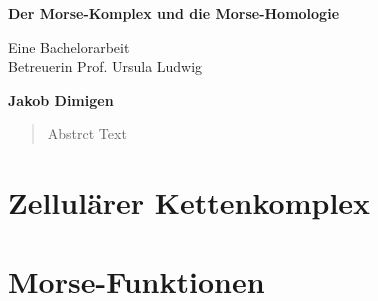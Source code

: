 \documentclass[a4paper,11pt,draft]{scrreport}
\begin{document}
\begin{titlepage}
    \begin{center}
        \vspace*{1cm}
 
        \Large{\textbf{Der Morse-Komplex und die Morse-Homologie}}
 
        \vspace{0.5cm}
        Eine Bachelorarbeit \\ 
        Betreuerin Prof. Ursula Ludwig
             
        \vspace{1.5cm}
 
        \textbf{Jakob Dimigen}
             
    \end{center}
\end{titlepage}

\begin{abstract}
    Abstrct Text
\end{abstract}

\tableofcontents









\section{Zellulärer Kettenkomplex}

\begin{definition}[CW-Komplex]

\end{definition}

\begin{definition}

\end{definition}

\section{Morse-Funktionen}

\begin{definition}

\end{definition}

\begin{definition}

\end{definition}
\end{document}
